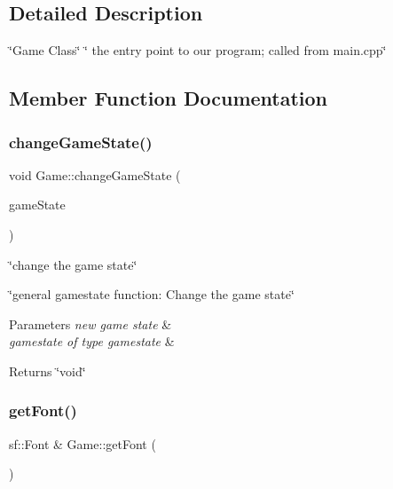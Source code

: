 \subsection{Detailed Description}
\char`\"{}\+Game Class\char`\"{}  \char`\"{} the entry point to our program; called from main.\+cpp\char`\"{} 

\subsection{Member Function Documentation}
\mbox{\label{classGame_a01f4a9f62ec168cc507b45c26cba8d7b}} 
\subsubsection{\texorpdfstring{change\+Game\+State()}{changeGameState()}}
{\footnotesize\ttfamily void Game\+::change\+Game\+State (\begin{DoxyParamCaption}\item[{Game\+State\+::\+State}]{game\+State }\end{DoxyParamCaption})}



\char`\"{}change the game state\char`\"{} 

\char`\"{}general gamestate function\+: Change the game state\char`\"{}


\begin{DoxyParams}{Parameters}
{\em new game state} & \\
\hline
{\em gamestate of type gamestate} & \\
\hline
\end{DoxyParams}
\begin{DoxyReturn}{Returns}
\char`\"{}void\char`\"{} 
\end{DoxyReturn}
\mbox{\label{classGame_a813ff20fa498389e4bb120090803676b}} 
\subsubsection{\texorpdfstring{get\+Font()}{getFont()}}
{\footnotesize\ttfamily sf\+::\+Font \& Game\+::get\+Font (\begin{DoxyParamCaption}{ }\end{DoxyParamCaption})}



